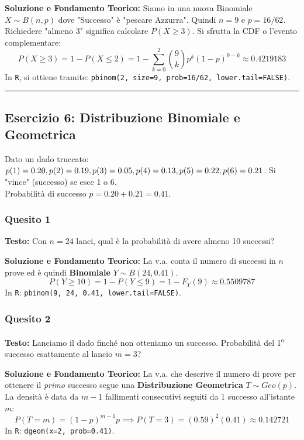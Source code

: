 \documentclass[12pt, a4paper]{article}
\begin{document}
\textbf{Soluzione e Fondamento Teorico:} 
Siamo in una nuova Binomiale $X \sim B(n,p)$ dove "Successo" è "pescare Azzurra". Quindi $n=9$ e $p=16/62$.
Richiedere "almeno 3" significa calcolare $P(X \ge 3)$. Si sfrutta la CDF o l'evento complementare:
$$ P(X \ge 3) = 1 - P(X \le 2) = 1 - \sum_{k=0}^{2} \binom{9}{k} p^k (1-p)^{9-k} \approx 0.4219183 $$
In \texttt{R}, si ottiene tramite: \texttt{pbinom(2, size=9, prob=16/62, lower.tail=FALSE)}.

\vspace{0.5cm}\hrule\vspace{0.5cm}

\subsection*{Esercizio 6: Distribuzione Binomiale e Geometrica}
Dato un dado truccato: $p(1)=0.20, p(2)=0.19, p(3)=0.05, p(4)=0.13, \\ p(5)=0.22, p(6)=0.21$. 
Si "vince" (successo) se esce 1 o 6. \\ Probabilità di successo $p = 0.20 + 0.21 = 0.41$.

\subsubsection*{Quesito 1}
\textbf{Testo:} Con $n=24$ lanci, qual è la probabilità di avere almeno 10 successi?

\textbf{Soluzione e Fondamento Teorico:} 
La v.a. conta il numero di successi in $n$ prove ed è quindi \textbf{Binomiale} $Y \sim B(24, 0.41)$.
$$ P(Y \ge 10) = 1 - P(Y \le 9) = 1 - F_Y(9) \approx 0.5509787 $$
In \texttt{R}: \texttt{pbinom(9, 24, 0.41, lower.tail=FALSE)}.

\subsubsection*{Quesito 2}
\textbf{Testo:} Lanciamo il dado finché non otteniamo un successo. Probabilità del 1\textsuperscript{o} successo esattamente al lancio $m=3$?

\textbf{Soluzione e Fondamento Teorico:} 
La v.a. che descrive il numero di prove per ottenere il \textit{primo} successo segue una \textbf{Distribuzione Geometrica} $T \sim Geo(p)$.
La densità è data da $m-1$ fallimenti consecutivi seguiti da 1 successo all'istante $m$:
$$ P(T=m) = (1-p)^{m-1} p \implies P(T=3) = (0.59)^2 (0.41) \approx 0.142721 $$
In \texttt{R}: \texttt{dgeom(x=2, prob=0.41)}.
\end{document}
